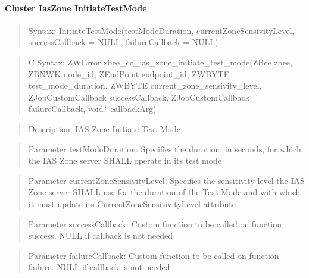 \paragraph{Cluster IasZone InitiateTestMode}
\begin{quote}Syntax: InitiateTestMode(testModeDuration, currentZoneSensivityLevel, successCallback = NULL, failureCallback = NULL)\end{quote}
\begin{quote}C Syntax: ZWError zbee\_cc\_ias\_zone\_initiate\_test\_mode(ZBee zbee, ZBNWK node\_id, ZEndPoint endpoint\_id, ZWBYTE test\_mode\_duration, ZWBYTE current\_zone\_sensivity\_level, ZJobCustomCallback successCallback, ZJobCustomCallback failureCallback, void* callbackArg)\end{quote}
\begin{quote}Description: IAS Zone Initiate Test Mode\end{quote}
\begin{quote}Parameter testModeDuration: Specifies the duration, in seconds, for which the IAS Zone server SHALL operate in its test mode\end{quote}
\begin{quote}Parameter currentZoneSensivityLevel: Specifies the sensitivity level the IAS Zone server SHALL use for the duration of the Test Mode and with which it must update its CurrentZoneSensitivityLevel attribute\end{quote}
\begin{quote}Parameter successCallback: Custom function to be called on function success. NULL if callback is not needed\end{quote}
\begin{quote}Parameter failureCallback: Custom function to be called on function failure. NULL if callback is not needed\end{quote}


